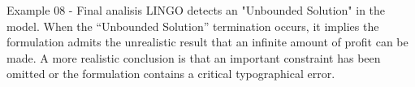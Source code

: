 \begin{frame}{Example 08 - Final analisis}
LINGO detects an "Unbounded Solution" in the model.
When the “Unbounded Solution” termination occurs, it implies the formulation
admits the unrealistic result  that an infinite amount of profit can be made. A more
realistic conclusion is that an important  constraint has been omitted or the
formulation contains a critical typographical error.
\end{frame}
